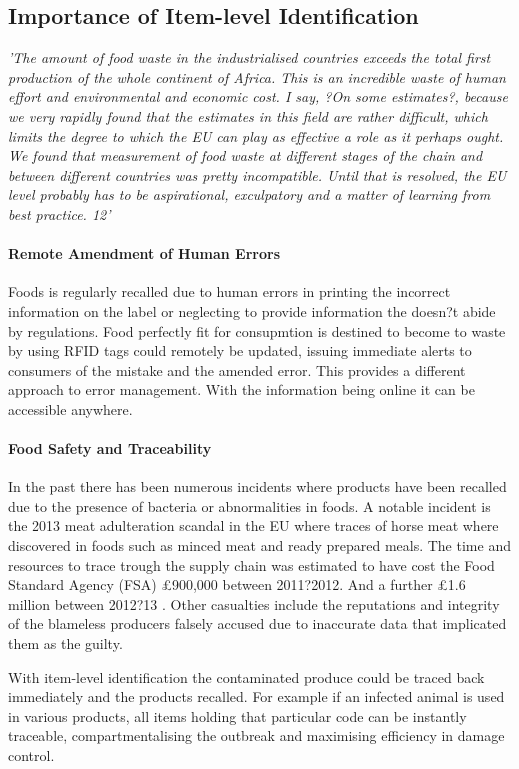 \documentclass[a4paper, 11pt]{article}
\begin{document}
\subsection{Importance of Item-level Identification}
\emph{'The amount of food waste in the industrialised countries exceeds the total first
production of the whole continent of Africa. This is an incredible waste of human effort
and environmental and economic cost. I say, ?On some estimates?, because we very
rapidly found that the estimates in this field are rather difficult, which limits the degree
to which the EU can play as effective a role as it perhaps ought. We found that
measurement of food waste at different stages of the chain and between different
countries was pretty incompatible. Until that is resolved, the EU level probably has to
be aspirational, exculpatory and a matter of learning from best practice. 12'}

\paragraph{Remote Amendment of Human Errors}
Foods is regularly recalled due to human errors in printing the incorrect information on the label or neglecting to provide information the doesn?t abide by regulations. Food perfectly fit for consupmtion is destined to become to waste by using RFID tags could remotely be updated, issuing immediate alerts to consumers of the mistake and the amended error. This provides a different approach to error management. With the information being online it can be accessible anywhere.

\paragraph{Food Safety and Traceability}
In the past there has been numerous incidents where products have been recalled due to the presence of bacteria or abnormalities in foods. A notable incident is the 2013 meat adulteration scandal in the EU where traces of horse meat where discovered in foods such as minced meat and ready prepared meals. The time and resources to trace trough the supply chain was estimated to have cost the Food Standard Agency (FSA) \pounds900,000 between 2011?2012. And a further \pounds1.6 million between 2012?13 \cite{3}. Other casualties include the reputations and integrity of the blameless producers falsely accused due to inaccurate data that implicated them as the guilty. 

With item-level identification the contaminated produce could be traced back immediately and the products recalled. For example if an infected animal is used in various products, all items holding that particular code can be instantly traceable, compartmentalising the outbreak and maximising efficiency in damage control. 
\end{document}
